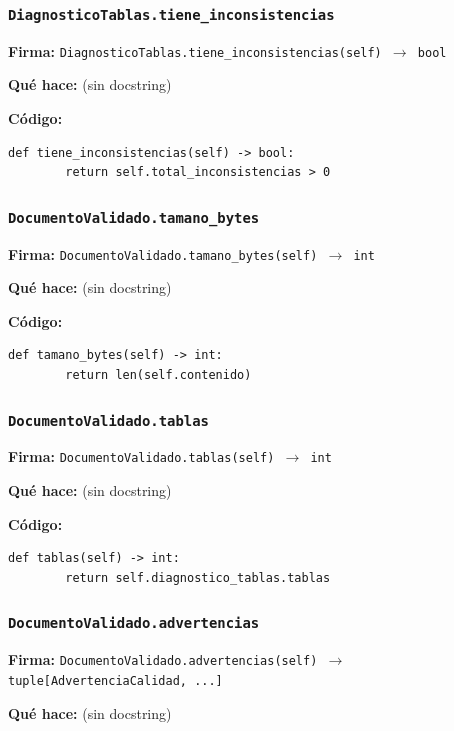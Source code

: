 \documentclass[11pt,a4paper]{article}
\begin{document}
\subsubsection*{\texttt{DiagnosticoTablas.tiene\_inconsistencias}}
\textbf{Firma:} \texttt{DiagnosticoTablas.tiene\_inconsistencias(self) $\rightarrow$ bool}

\textbf{Qué hace:} (sin docstring)

\textbf{Código:}
\begin{lstlisting}
def tiene_inconsistencias(self) -> bool:
        return self.total_inconsistencias > 0
\end{lstlisting}

\subsubsection*{\texttt{DocumentoValidado.tamano\_bytes}}
\textbf{Firma:} \texttt{DocumentoValidado.tamano\_bytes(self) $\rightarrow$ int}

\textbf{Qué hace:} (sin docstring)

\textbf{Código:}
\begin{lstlisting}
def tamano_bytes(self) -> int:
        return len(self.contenido)
\end{lstlisting}

\subsubsection*{\texttt{DocumentoValidado.tablas}}
\textbf{Firma:} \texttt{DocumentoValidado.tablas(self) $\rightarrow$ int}

\textbf{Qué hace:} (sin docstring)

\textbf{Código:}
\begin{lstlisting}
def tablas(self) -> int:
        return self.diagnostico_tablas.tablas
\end{lstlisting}

\subsubsection*{\texttt{DocumentoValidado.advertencias}}
\textbf{Firma:} \texttt{DocumentoValidado.advertencias(self) $\rightarrow$ tuple[AdvertenciaCalidad, ...]}

\textbf{Qué hace:} (sin docstring)
\end{document}
